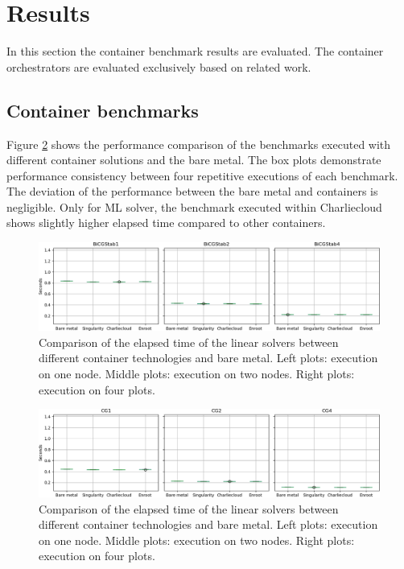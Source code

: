 \documentclass[conference]{IEEEtran}
\begin{document}
\section{Results}
In this section the container benchmark results are evaluated. The container orchestrators are evaluated exclusively based on related work.

\subsection{Container benchmarks}
Figure \ref{fig:container_benchmarks} shows the performance comparison of the benchmarks executed with different container solutions and the bare metal. The box plots demonstrate performance consistency between four repetitive executions of each benchmark. The deviation of the performance between the bare metal and containers is negligible. Only for ML solver, the benchmark executed within Charliecloud shows slightly higher elapsed time compared to other containers.

\begin{figure}
\centering
\includegraphics[width=\textwidth]{images/2.png}
\caption{Comparison of the elapsed time of the linear solvers between different container technologies and bare metal. Left plots: execution on one node. Middle plots: execution on two nodes. Right plots: execution on four plots.}
\label{fig:container_benchmarks}
\end{figure}

\begin{figure}
\centering
\includegraphics[width=\textwidth]{images/3.png}
\caption{Comparison of the elapsed time of the linear solvers between different container technologies and bare metal. Left plots: execution on one node. Middle plots: execution on two nodes. Right plots: execution on four plots.}
\label{fig:container_benchmarks}
\end{figure}
\end{document}
